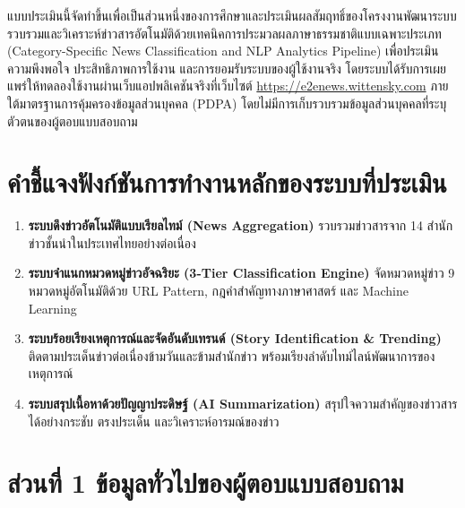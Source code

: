 
แบบประเมินนี้จัดทำขึ้นเพื่อเป็นส่วนหนึ่งของการศึกษาและประเมินผลสัมฤทธิ์ของโครงงานพัฒนาระบบรวบรวมและวิเคราะห์ข่าวสารอัตโนมัติด้วยเทคนิคการประมวลผลภาษาธรรมชาติแบบเฉพาะประเภท (Category-Specific News Classification and NLP Analytics Pipeline) เพื่อประเมินความพึงพอใจ ประสิทธิภาพการใช้งาน และการยอมรับระบบของผู้ใช้งานจริง โดยระบบได้รับการเผยแพร่ให้ทดลองใช้งานผ่านเว็บแอปพลิเคชันจริงที่เว็บไซต์ \url{https://e2enews.wittensky.com} ภายใต้มาตรฐานการคุ้มครองข้อมูลส่วนบุคคล (PDPA) โดยไม่มีการเก็บรวบรวมข้อมูลส่วนบุคคลที่ระบุตัวตนของผู้ตอบแบบสอบถาม

\section*{คำชี้แจงฟังก์ชันการทำงานหลักของระบบที่ประเมิน}

\begin{enumerate}
    \item \textbf{ระบบดึงข่าวอัตโนมัติแบบเรียลไทม์ (News Aggregation)} รวบรวมข่าวสารจาก 14 สำนักข่าวชั้นนำในประเทศไทยอย่างต่อเนื่อง
    \item \textbf{ระบบจำแนกหมวดหมู่ข่าวอัจฉริยะ (3-Tier Classification Engine)} จัดหมวดหมู่ข่าว 9 หมวดหมู่อัตโนมัติด้วย URL Pattern, กฎคำสำคัญทางภาษาศาสตร์ และ Machine Learning
    \item \textbf{ระบบร้อยเรียงเหตุการณ์และจัดอันดับเทรนด์ (Story Identification \& Trending)} ติดตามประเด็นข่าวต่อเนื่องข้ามวันและข้ามสำนักข่าว พร้อมเรียงลำดับไทม์ไลน์พัฒนาการของเหตุการณ์
    \item \textbf{ระบบสรุปเนื้อหาด้วยปัญญาประดิษฐ์ (AI Summarization)} สรุปใจความสำคัญของข่าวสารได้อย่างกระชับ ตรงประเด็น และวิเคราะห์อารมณ์ของข่าว
\end{enumerate}

\section*{ส่วนที่ 1 ข้อมูลทั่วไปของผู้ตอบแบบสอบถาม}

